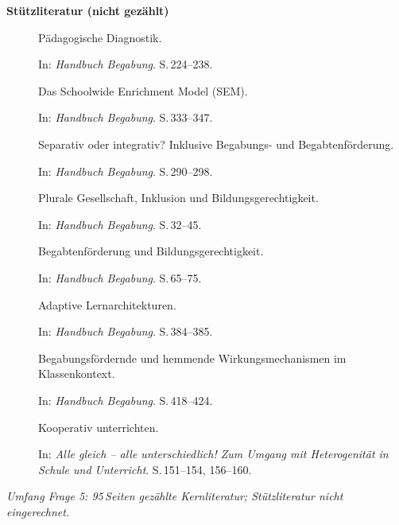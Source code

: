 \textbf{Stützliteratur (nicht gezählt)}

\begin{description}
  \item[\cite{muelleroppliger2021paeddiagnostik}] Pädagogische Diagnostik.
    
    In: \textit{Handbuch Begabung}.
    S.\,224--238.

  \item[\cite{reisrenzullimueller2021sem}] Das Schoolwide Enrichment Model (SEM).
    
    In: \textit{Handbuch Begabung}.
    S.\,333--347.

  \item[\cite{weigand2021separativ}] Separativ oder integrativ? Inklusive Begabungs- und Begabtenförderung.
    
    In: \textit{Handbuch Begabung}.
    S.\,290--298.

  \item[\cite{muelleroppliger2021plurale}] Plurale Gesellschaft, Inklusion und Bildungsgerechtigkeit.
    
    In: \textit{Handbuch Begabung}.
    S.\,32--45.

  \item[\cite{sedmak2021bildungsgerechtigkeit}] Begabtenförderung und Bildungsgerechtigkeit.
    
    In: \textit{Handbuch Begabung}.
    S.\,65--75.

  \item[\cite{muelleroppliger2021adaptive}] Adaptive Lernarchitekturen.
    
    In: \textit{Handbuch Begabung}.
    S.\,384--385.

  \item[\cite{wagener2021bfhemmendfoerdernd}] Begabungsfördernde und hemmende Wirkungsmechanismen im Klassenkontext.
    
    In: \textit{Handbuch Begabung}.
    S.\,418--424.

  \item[\cite{kummerwyss2017kooperativunterrichten}] Kooperativ unterrichten.
    
    In: \textit{Alle gleich -- alle unterschiedlich! Zum Umgang mit Heterogenität in Schule und Unterricht}.
    S.\,151--154, 156--160.

\end{description}

\textit{Umfang Frage 5: 95\,Seiten gezählte Kernliteratur; Stützliteratur nicht eingerechnet.}

